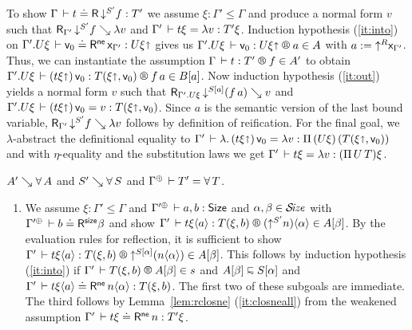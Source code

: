 \documentclass[acmsmall%
]{acmart}\settopmatter{printfolios=true}
\makeatletter
\newenvironment{proof*}[1][\proofname]{\par
  \normalfont \topsep6\p@\@plus6\p@\relax
  \trivlist
  \item[\@proofindent\hskip\labelsep
        {\@proofnamefont #1\@addpunct{.}}]\ignorespaces
}{%
  \endtrivlist\@endpefalse
}
\makeatother
\begin{document}
{\begin{proof*}
\begin{caselist}
\begin{enumerate}
To show $\Gamma \,\vdash t \doteq \mathsf{R}\,\mathord{\downarrow^{S'}} f : {T'}$
we assume $\xi : \Gamma' \leq \Gamma$ and produce a normal form $v$
such that $\mathsf{R}_{\Gamma'} \, \mathord{\downarrow^{S'}} f \searrow \lambda v$ and
$\Gamma' \,\vdash t\xi = \lambda v : T'\xi$.
Induction hypothesis (\ref{it:into}) on
$\Gamma'.{U\xi} \,\vdash \mathsf{v}_{0} \doteq \mathsf{R}^{\mathsf{ne}}\, \mathsf{x}_{\Gamma'} : U\xi\mathord{\shortuparrow}$
gives us $\LR {\cext{\Gamma'}{U\xi}} {\ind 0} {U\xi\slift} a A$
with $a := \mathord{\uparrow^{R}} {\mathsf{x}_{\Gamma'}}$.
Thus, we can instantiate the assumption $\LR \Gamma t {T'} f {A'}$
to obtain
$\LR {\cext{\Gamma'}{U\xi}} {(t\xi\slift)\,\ind 0} {T(\xi\slift,\ind 0)} {f\,a} {B[a]}$.
Now induction hypothesis (\ref{it:out}) yields a normal form $v$ such that
$\mathsf{R}_{\Gamma'.{U\xi}} \, \mathord{\downarrow^{S[a]}} (f\,a) \searrow v$
and
$\Gamma'.{U\xi} \,\vdash (t\xi\mathord{\shortuparrow})\,\mathsf{v}_{0} = v : T(\xi\mathord{\shortuparrow},\mathsf{v}_{0})$.
Since $a$ is the semantic version of the last bound variable,
$\mathsf{R}_{\Gamma'} \, \mathord{\downarrow^{S'}} f \searrow \lambda v$ follows by definition of reification.
For the final goal, we $\lambda$-abstract the definitional equality to
$\Gamma' \,\vdash \lambda.\, (t\xi\mathord{\shortuparrow})\,\mathsf{v}_{0} = \lambda v : \Pi\,(U\xi)\, {(T(\xi\mathord{\shortuparrow},\mathsf{v}_{0}))}$
and with $\eta$-equality and the substitution laws we get
$\Gamma' \,\vdash t\xi = \lambda v : (\Pi\,U\, T)\xi$.
\end{enumerate}

\nextcase $A' \searrow \forall\, A$ and $S' \searrow \forall\, S$ and
$\resurrect\Gamma \der T' = \forallT T$.

\begin{enumerate}

\item %
We assume $\xi : \Gamma' \leq \Gamma$ and
$\resurrect{\Gamma'} \der a, b : \Size$ and $\alpha,\beta \in \mathcal{S}\!\mathit{ize}$ with
$\LRSize {\resurrect{\Gamma'}} b \beta$ and show
$\LR {\Gamma'} {t\xi\ann a} {T(\xi,b)} {(\up {S'} n) \ann \alpha} {A[\beta]}$.
By the evaluation rules for reflection, it is sufficient to show
$\LR {\Gamma'} {t\xi\ann a} {T(\xi,b)} {\up {S[\alpha]} (n \ann \alpha)} {A[\beta]}$.
This follows by induction hypothesis (\ref{it:into}) if
$\LRTS {\Gamma'} {T(\xi,b)} {A[\beta]} s$ and $A[\beta] \shape S[\alpha]$ and
$\Gamma' \,\vdash t\xi\langle a\rangle \doteq \mathsf{R}^{\mathsf{ne}}\, n \langle\alpha\rangle : T(\xi,b)$.
The first two of these subgoals are immediate.
The third follows by Lemma~\ref{lem:rclosne} (\ref{it:closneall}) from the
weakened assumption $\Gamma' \,\vdash t\xi \doteq \mathsf{R}^{\mathsf{ne}}\, n : T'\xi$.
%


\end{enumerate}
\end{caselist}
\end{proof*}}
\end{document}
